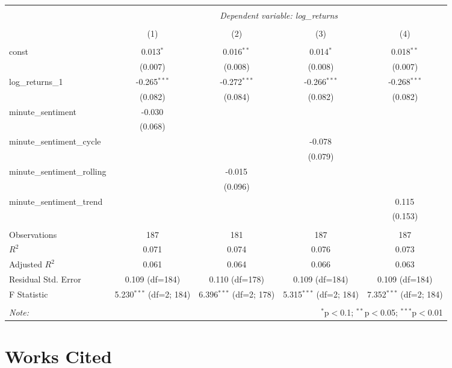 \documentclass[12pt, letterpaper]{article}
\begin{document}
    \begin{table}[H] 
        \begin{adjustbox}{width=\textwidth}
        \centering
        \begin{tabular}{@{\extracolsep{5pt}}lcccc}
        \\[-1.8ex]\hline
        \hline \\[-1.8ex]
        & \multicolumn{4}{c}{\textit{Dependent variable: log\_returns}} \\
        \cline{2-5}
        \\[-1.8ex] & (1) & (2) & (3) & (4) \\
        \hline \\[-1.8ex]
         const & 0.013$^{*}$ & 0.016$^{**}$ & 0.014$^{*}$ & 0.018$^{**}$ \\
        & (0.007) & (0.008) & (0.008) & (0.007) \\
         log\_returns\_1 & -0.265$^{***}$ & -0.272$^{***}$ & -0.266$^{***}$ & -0.268$^{***}$ \\
        & (0.082) & (0.084) & (0.082) & (0.082) \\
         minute\_sentiment & -0.030$^{}$ & & & \\
        & (0.068) & & & \\
         minute\_sentiment\_cycle & & & -0.078$^{}$ & \\
        & & & (0.079) & \\
         minute\_sentiment\_rolling & & -0.015$^{}$ & & \\
        & & (0.096) & & \\
         minute\_sentiment\_trend & & & & 0.115$^{}$ \\
        & & & & (0.153) \\
        \hline \\[-1.8ex]
         Observations & 187 & 181 & 187 & 187 \\
         $R^2$ & 0.071 & 0.074 & 0.076 & 0.073 \\
         Adjusted $R^2$ & 0.061 & 0.064 & 0.066 & 0.063 \\
         Residual Std. Error & 0.109 (df=184) & 0.110 (df=178) & 0.109 (df=184) & 0.109 (df=184) \\
         F Statistic & 5.230$^{***}$ (df=2; 184) & 6.396$^{***}$ (df=2; 178) & 5.315$^{***}$ (df=2; 184) & 7.352$^{***}$ (df=2; 184) \\
        \hline
        \hline \\[-1.8ex]
        \textit{Note:} & \multicolumn{4}{r}{$^{*}$p$<$0.1; $^{**}$p$<$0.05; $^{***}$p$<$0.01} \\
        \end{tabular}
        \end{adjustbox}
        \end{table}
        

\section{Works Cited}
\end{document}
